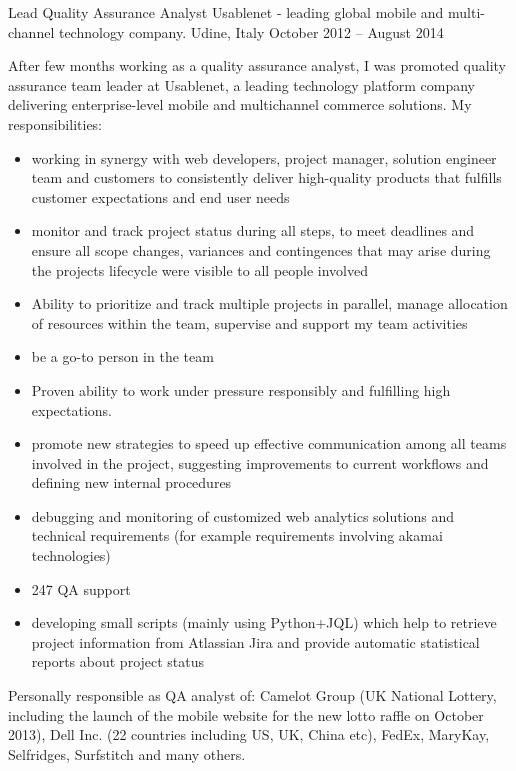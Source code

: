 \begin{cventries}
\cventry
{Lead Quality Assurance Analyst} 
{Usablenet - leading global mobile and multi-channel technology company.}
   {Udine, Italy}
{October 2012 -- August 2014}
   {
      After few months working as a quality assurance analyst, I was
      promoted 
   quality assurance team leader at Usablenet, a leading 
  technology platform  company delivering enterprise-level mobile and
  multichannel commerce solutions.
   My responsibilities:
   \begin{itemize}
\item 
  working in synergy with  web
   developers, project manager, solution engineer team and customers to
   consistently deliver high-quality
   products that fulfills customer expectations and end user needs
\item monitor and track project status during all steps, to meet deadlines
   and ensure all scope changes,
 variances and contingences that may arise during the 
 projects lifecycle were visible to all people involved
 \item 
   Ability to prioritize and track multiple projects in parallel,
    manage  allocation of resources within the team, supervise and support my team
    activities
 \item  be a go-to person in the team
 \item 
   Proven ability to work under pressure responsibly and fulfilling high
   expectations.
\item promote new strategies to speed up effective communication among all
   teams involved in the project, suggesting 
   improvements to current workflows and defining new internal procedures
\item debugging and monitoring of customized web analytics solutions and 
technical requirements (for example requirements involving
   akamai technologies)
\item 247 QA support 
   \item developing small scripts (mainly using Python+JQL) which help to retrieve project
 information from Atlassian Jira and provide automatic statistical reports about project status
 \end{itemize} 
   Personally responsible as QA analyst of:
   Camelot Group (UK National Lottery, including the
   launch of the mobile website for the new lotto raffle on October 2013), Dell Inc. (22 countries
   including US, UK, China etc), FedEx,
   MaryKay, Selfridges, Surfstitch and many others.
}
\end{cventries}
